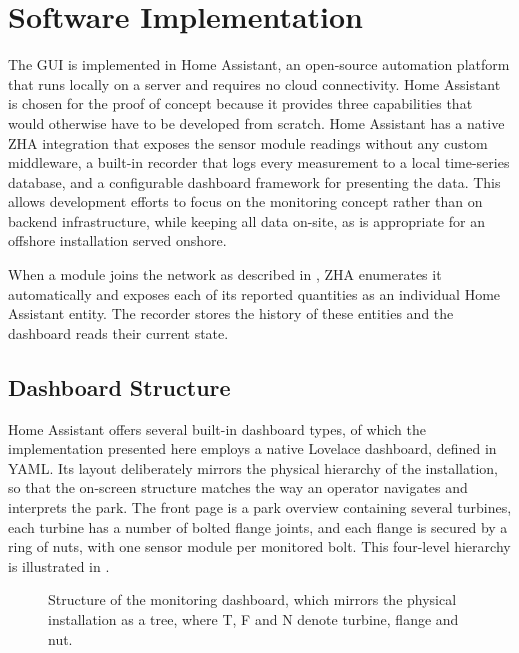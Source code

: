 \section{Software Implementation} \label{sec:Software_imp}

The GUI is implemented in Home Assistant, an open-source automation platform that runs locally on a server and requires no cloud connectivity. Home Assistant is chosen for the proof of concept because it provides three capabilities that would otherwise have to be developed from scratch. Home Assistant has a native ZHA integration that exposes the sensor module readings without any custom middleware, a built-in recorder that logs every measurement to a local time-series database, and a configurable dashboard framework for presenting the data. This allows development efforts to focus on the monitoring concept rather than on backend infrastructure, while keeping all data on-site, as is appropriate for an offshore installation served onshore.

When a module joins the network as described in , ZHA enumerates it automatically and exposes each of its reported quantities as an individual Home Assistant entity. The recorder stores the history of these entities and the dashboard reads their current state.

\subsection{Dashboard Structure}
Home Assistant offers several built-in dashboard types, of which the implementation presented here employs a native Lovelace dashboard, defined in YAML. Its layout deliberately mirrors the physical hierarchy of the installation, so that the on-screen structure matches the way an operator navigates and interprets the park. The front page is a park overview containing several turbines, each turbine has a number of bolted flange joints, and each flange is secured by a ring of nuts, with one sensor module per monitored bolt. This four-level hierarchy is illustrated in .

\begin{figure}[!b]
\centering

    \caption{Structure of the monitoring dashboard, which mirrors the physical installation as a tree, where T, F and N denote turbine, flange and nut.}
    \label{fig:gui_hierarchy}
\end{figure}

